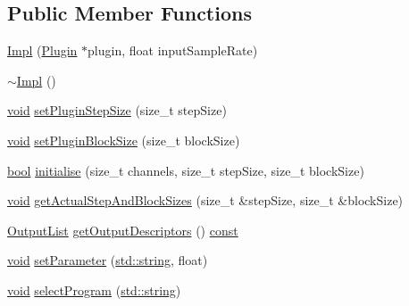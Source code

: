 \subsection*{Public Member Functions}
\begin{DoxyCompactItemize}
\item 
\hyperlink{class_vamp_1_1_host_ext_1_1_plugin_buffering_adapter_1_1_impl_a97990c497a954220254172f2554e608e}{Impl} (\hyperlink{class_vamp_1_1_plugin}{Plugin} $\ast$plugin, float input\+Sample\+Rate)
\item 
\hyperlink{class_vamp_1_1_host_ext_1_1_plugin_buffering_adapter_1_1_impl_a772d000b68dde932323ed39ab65e1a9a}{$\sim$\+Impl} ()
\item 
\hyperlink{sound_8c_ae35f5844602719cf66324f4de2a658b3}{void} \hyperlink{class_vamp_1_1_host_ext_1_1_plugin_buffering_adapter_1_1_impl_a1d12e3d878b659179b170dc52b9da35f}{set\+Plugin\+Step\+Size} (size\+\_\+t step\+Size)
\item 
\hyperlink{sound_8c_ae35f5844602719cf66324f4de2a658b3}{void} \hyperlink{class_vamp_1_1_host_ext_1_1_plugin_buffering_adapter_1_1_impl_a18ec0703d4b37041b6a8578e069d900f}{set\+Plugin\+Block\+Size} (size\+\_\+t block\+Size)
\item 
\hyperlink{mac_2config_2i386_2lib-src_2libsoxr_2soxr-config_8h_abb452686968e48b67397da5f97445f5b}{bool} \hyperlink{class_vamp_1_1_host_ext_1_1_plugin_buffering_adapter_1_1_impl_a4b2bbe763ec728b5494145abcebca2e2}{initialise} (size\+\_\+t channels, size\+\_\+t step\+Size, size\+\_\+t block\+Size)
\item 
\hyperlink{sound_8c_ae35f5844602719cf66324f4de2a658b3}{void} \hyperlink{class_vamp_1_1_host_ext_1_1_plugin_buffering_adapter_1_1_impl_a6907440b5c929820673cf3cbf538abcf}{get\+Actual\+Step\+And\+Block\+Sizes} (size\+\_\+t \&step\+Size, size\+\_\+t \&block\+Size)
\item 
\hyperlink{class_vamp_1_1_plugin_a30f531b8fb69fac41a24e3d2a6a08ed9}{Output\+List} \hyperlink{class_vamp_1_1_host_ext_1_1_plugin_buffering_adapter_1_1_impl_a4e8dcacfca3f1b82ac7d70c9d3ddddaf}{get\+Output\+Descriptors} () \hyperlink{getopt1_8c_a2c212835823e3c54a8ab6d95c652660e}{const} 
\item 
\hyperlink{sound_8c_ae35f5844602719cf66324f4de2a658b3}{void} \hyperlink{class_vamp_1_1_host_ext_1_1_plugin_buffering_adapter_1_1_impl_aff67a70b472edd051c4284f7a049c939}{set\+Parameter} (\hyperlink{test__lib_f_l_a_c_2format_8c_ab02026ad0de9fb6c1b4233deb0a00c75}{std\+::string}, float)
\item 
\hyperlink{sound_8c_ae35f5844602719cf66324f4de2a658b3}{void} \hyperlink{class_vamp_1_1_host_ext_1_1_plugin_buffering_adapter_1_1_impl_a62b3c1f0ab28d8e22af36d179b03bf17}{select\+Program} (\hyperlink{test__lib_f_l_a_c_2format_8c_ab02026ad0de9fb6c1b4233deb0a00c75}{std\+::string})

\end{DoxyCompactItemize}
